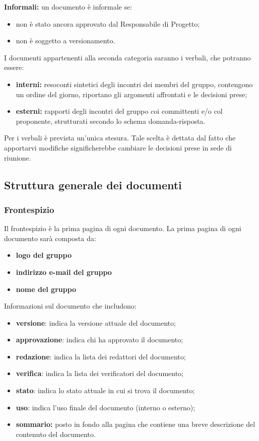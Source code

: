  \textbf{Informali:} un documento è informale se:
\begin{itemize}
\item non è stato ancora approvato dal Responsabile di Progetto;
	\item non è soggetto a versionamento.
\end{itemize}
I documenti appartenenti alla seconda categoria saranno i verbali, che potranno
essere:
\begin{itemize}
\item \textbf{interni:} resoconti sintetici degli incontri dei membri del gruppo, contengono un ordine del giorno, riportano gli argomenti affrontati e le decisioni prese;
	\item \textbf{esterni:} rapporti degli incontri del gruppo coi committenti e/o col proponente, strutturati secondo lo schema domanda-risposta.
\end{itemize}
Per i verbali è prevista un’unica stesura. Tale scelta è dettata dal fatto che apportarvi modifiche significherebbe cambiare le decisioni prese in sede di riunione.
\\
\subsection{Struttura generale dei documenti}
\subsubsection{Frontespizio}
Il frontespizio è la prima pagina di ogni documento. 
La prima pagina di ogni documento sarà composta da:
\begin{itemize}
	\item \textbf{logo del gruppo}
		\item \textbf{indirizzo e-mail del gruppo}
			\item \textbf{nome del gruppo}
\end{itemize}
Informazioni sul documento che includono:
\begin{itemize}
	\item \textbf{versione}: indica la versione attuale del documento;
		\item \textbf{approvazione}: indica chi ha approvato il documento;
			\item \textbf{redazione}: indica la lista dei redattori del documento;
				\item \textbf{verifica}: indica la lista dei verificatori del documento; 
					\item \textbf{stato}: indica lo stato attuale in cui si trova il documento;
						\item \textbf{uso}: indica l’uso finale del documento (interno o esterno); 
							\item \textbf{sommario:} posto in fondo alla pagina che contiene una breve descrizione del contenuto del documento.
\end{itemize}
